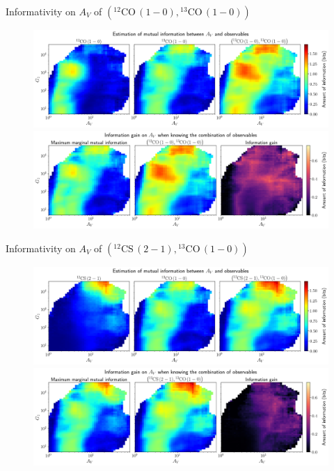 \documentclass{beamer}
\begin{document}
\begin{frame}{Informativity on $A_V$ of $\left(\mathrm{^{12}CO\,(1-0)},\mathrm{^{13}CO\,(1-0)}\right)$}
    \begin{figure}
        \centering
        \includegraphics[width=0.95\linewidth]{../mi/av__12co10_13co10_mi.png}
        \vfill
        \includegraphics[width=0.95\linewidth]{../mi/av__12co10_13co10_mi_gain.png}
    \end{figure}
\end{frame}

\begin{frame}{Informativity on $A_V$ of $\left(\mathrm{^{12}CS\,(2-1)},\mathrm{^{13}CO\,(1-0)}\right)$}
    \begin{figure}
        \centering
        \includegraphics[width=0.95\linewidth]{../mi/av__12cs21_13co10_mi.png}
        \vfill
        \includegraphics[width=0.95\linewidth]{../mi/av__12cs21_13co10_mi_gain.png}
    \end{figure}
\end{frame}
\end{document}
